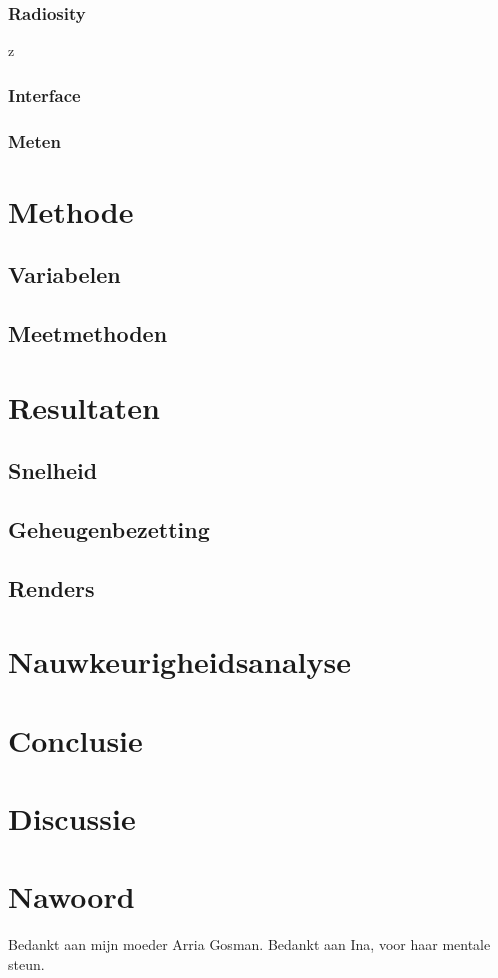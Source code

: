 \documentclass[12pt, a4paper]{article}
\begin{document}
\subsubsection{Radiosity}z
\subsubsection{Interface}
\subsubsection{Meten}
\clearpage
\section{Methode}
\subsection{Variabelen}
\subsection{Meetmethoden}
\clearpage
\section{Resultaten}
\subsection{Snelheid}
\subsection{Geheugenbezetting}
\subsection{Renders}
\clearpage
\section{Nauwkeurigheidsanalyse}
\clearpage
\section{Conclusie}
\clearpage
\section{Discussie}
\clearpage
\section{Nawoord}
Bedankt aan mijn moeder Arria Gosman.
Bedankt aan Ina, voor haar mentale steun.
\clearpage
\end{document}

